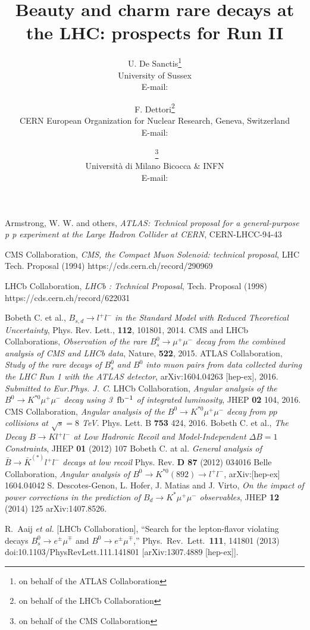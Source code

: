 \documentclass{PoS}
\title{Beauty and charm rare decays at the LHC: prospects for Run II}
\author{U. De Sanctis\thanks{on behalf of the ATLAS Collaboration}\\
        University of Sussex\\
        E-mail: \email{umberto.de.sanctis@cern.ch}\\}
\author{F. Dettori\thanks{on behalf of the LHCb Collaboration}\\
        CERN European Organization for Nuclear Research, Geneva, Switzerland\\
        E-mail: \email{francesco.dettori@cern.ch}\\ }
\author{\speaker{S. Fiorendi}~\thanks{on behalf of the CMS Collaboration}\\
       Universit\`a di Milano Bicocca \& INFN\\
        E-mail: \email{sara.fiorendi@cern.ch}
	}
\begin{document}





\begin{thebibliography}{99}
 Armstrong, W. W. and others, 
{\it{ATLAS: Technical proposal for a general-purpose p p experiment at the Large Hadron Collider at CERN}},
CERN-LHCC-94-43 

 CMS Collaboration, 
{\it{CMS, the Compact Muon Solenoid: technical proposal}},
LHC Tech. Proposal (1994) 
https://cds.cern.ch/record/290969

 LHCb Collaboration, 
{\it{LHCb : Technical Proposal}},
Tech. Proposal (1998) https://cds.cern.ch/record/622031

 Bobeth C. et al., {\it{$B_{s,d} \to l^+ l^-$ in the Standard Model with Reduced Theoretical Uncertainty}}, Phys. Rev. Lett., {\bf{112}}, 101801, 2014.
 CMS and LHCb Collaborations, {\it{Observation of the rare $B^0_s\rightarrow\mu^+\mu^-$ decay from the combined analysis of CMS and LHCb data}}, Nature, {\bf{522}}, 2015.
 ATLAS Collaboration, {\it{Study of the rare decays of $B^0_s$ and $B^0$  into muon pairs from data collected during the LHC Run 1 with the ATLAS detector}}, arXiv:1604.04263 [hep-ex], 2016. {\it{Submitted to Eur.Phys. J. C}}.
 LHCb Collaboration, {\it{Angular analysis of the $B^0 \to K^{*0}  \mu^+ \mu^-$ decay using 3~${\rm{fb^{-1}}}$ of integrated luminosity}}, JHEP {\bf{02}} 104, 2016. 
 CMS Collaboration, {\it{Angular analysis of the $B^0 \to K^{*0}  \mu^+ \mu^-$  decay from $pp$ collisions at $\sqrt{s} = 8$ TeV}}. Phys. Lett. B {\bf{753}} 424, 2016.
 Bobeth C. et al., {\it{The Decay $B \to K l^+ l^-$ at Low Hadronic Recoil and Model-Independent $\Delta B = 1$ Constraints}}, JHEP {\bf{01}} (2012) 107 \newline
Bobeth C. at al. {\it{General analysis of $\bar{B} \to \bar{K}^{(*)} l^+ l^−$ decays at low recoil}} Phys. Rev. {\bf{D 87}} (2012) 034016
 Belle Collaboration, {\it{Angular analysis of $B^0 \to K^{*0}(892) \to l^+ l^-$}}, arXiv:[hep-ex] 1604.04042
 S. Descotes-Genon, L. Hofer, J. Matias and J. Virto, {\it{On the impact of power corrections in the prediction of $B_d \to K^* \mu^+ \mu^-$ observables}}, JHEP {\bf{12}} (2014) 125 arXiv:1407.8526.

  R.~Aaij {\it et al.} [LHCb Collaboration],
  ``Search for the lepton-flavor violating decays $B^0_s \rightarrow e^{\pm}\mu^{\mp}$ and $B^0 \rightarrow e^{\pm} \mu^{\mp}$,''
  Phys.\ Rev.\ Lett.\  {\bf 111}, 141801 (2013)
  doi:10.1103/PhysRevLett.111.141801
  [arXiv:1307.4889 [hep-ex]].


\end{thebibliography}
\end{document}
